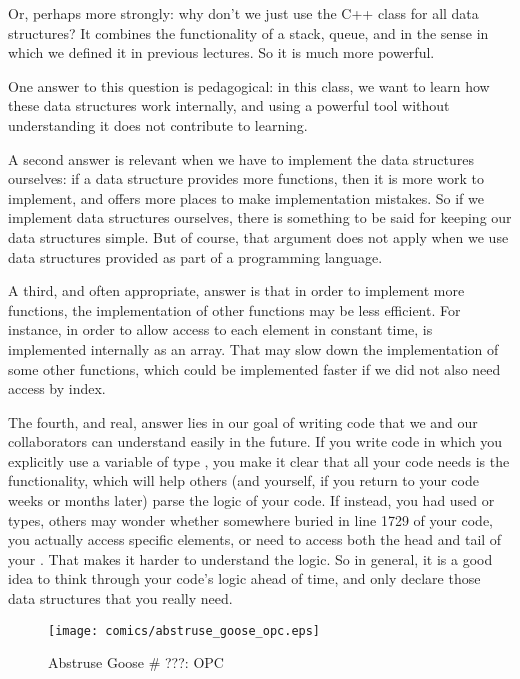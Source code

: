 Or, perhaps more strongly: why don't we just use the C++ 
class for all data structures?
It combines the functionality of a stack, queue, and  in
the sense in which we defined it in previous lectures.
So it is much more powerful.

One answer to this question is pedagogical: in this class, we want to
learn how these data structures work internally, and using a powerful
tool without understanding it does not contribute to learning.

A second answer is relevant when we have to implement the data
structures ourselves:
if a data structure provides more functions,
then it is more work to implement,
and offers more places to make implementation mistakes.
So if we implement data structures ourselves,
there is something to be said for keeping our data structures simple.
But of course, that argument does not apply when we use data
structures provided as part of a programming language.

A third, and often appropriate, answer is that in order to implement
more functions, the implementation of other functions may be less
efficient. For instance, in order to allow access to each element in
constant time,  is implemented internally as an array.
That may slow down the implementation of some other functions,
which could be implemented faster if we did not also need access by
index.

The fourth, and real, answer lies in our goal of writing code that we
and our collaborators can understand easily in the future. 
If you write code in which you explicitly use a variable of type
, you make it clear that all your code needs is the
 functionality, which will help others
(and yourself, if you return to your code weeks or months later)
parse the logic of your code.
If instead, you had used  or  types,
others may wonder whether somewhere buried in line 1729 of your code,
you actually access specific elements, or need to access both the head
and tail of your . That makes it harder to understand the
logic. So in general, it is a good idea to think through your code's
logic ahead of time, and only declare those data structures that you
really need.

\begin{figure}[htb]
\centering
\texttt{[image: comics/abstruse\_goose\_opc.eps]}
\caption{Abstruse Goose \# ???: OPC}
\end{figure}

